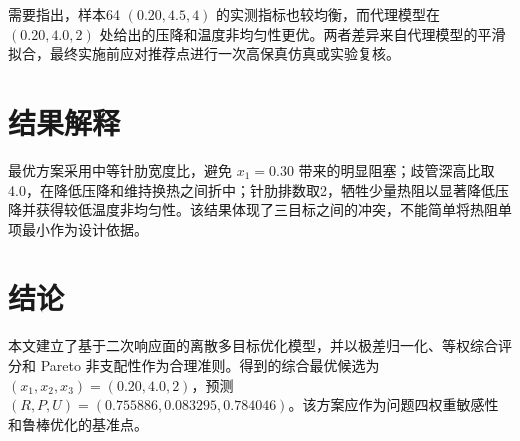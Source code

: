 \documentclass[UTF8,a4paper,12pt]{ctexart}
\begin{document}
需要指出，样本64 $(0.20,4.5,4)$ 的实测指标也较均衡，而代理模型在 $(0.20,4.0,2)$ 处给出的压降和温度非均匀性更优。两者差异来自代理模型的平滑拟合，最终实施前应对推荐点进行一次高保真仿真或实验复核。

\section{结果解释}
最优方案采用中等针肋宽度比，避免 $x_1=0.30$ 带来的明显阻塞；歧管深高比取4.0，在降低压降和维持换热之间折中；针肋排数取2，牺牲少量热阻以显著降低压降并获得较低温度非均匀性。该结果体现了三目标之间的冲突，不能简单将热阻单项最小作为设计依据。

\section{结论}
本文建立了基于二次响应面的离散多目标优化模型，并以极差归一化、等权综合评分和 Pareto 非支配性作为合理准则。得到的综合最优候选为 $(x_1,x_2,x_3)=(0.20,4.0,2)$，预测 $(R,P,U)=(0.755886,0.083295,0.784046)$。该方案应作为问题四权重敏感性和鲁棒优化的基准点。
\end{document}
